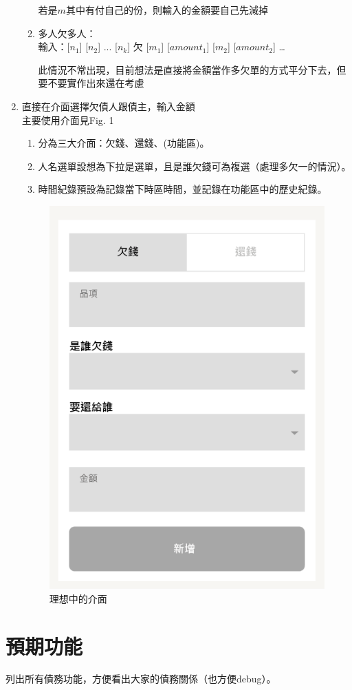 \documentclass[conference]{IEEEtran}
\begin{document}
\begin{CJK*}{UTF8}{bsmi}
\begin{enumerate}
\begin{enumerate}
    若是$m$其中有付自己的份，則輸入的金額要自己先減掉

    \item 多人欠多人：\\ 
        輸入：[$n_1$] [$n_2$] ... [$n_k$] 欠 [$m_1$] [$amount_1$] [$m_2$] [$amount_2$] …

    此情況不常出現，目前想法是直接將金額當作多欠單的方式平分下去，但要不要實作出來還在考慮
        
    \end{enumerate}    
  \item 直接在介面選擇欠債人跟債主，輸入金額\\ 
      主要使用介面見Fig. 1

        \begin{enumerate}
            \item 分為三大介面：欠錢、還錢、(功能區)。
            \item 人名選單設想為下拉是選單，且是誰欠錢可為複選（處理多欠一的情況）。
            \item 時間紀錄預設為記錄當下時區時間，並記錄在功能區中的歷史紀錄。
            
        \end{enumerate}

    \begin{figure}[htbp]
        \centerline{\includegraphics[height=0.5\textwidth]{gui.png}}
    \caption{理想中的介面}
    \label{fig}
    \end{figure}

\end{enumerate}


\section{預期功能}

列出所有債務功能，方便看出大家的債務關係（也方便debug）。


\end{CJK*}
\end{document}
